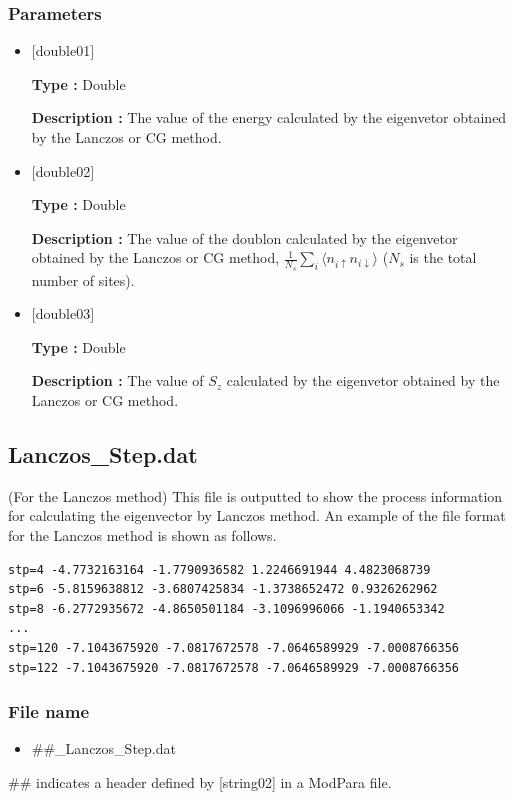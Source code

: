 \subsubsection{Parameters}
 \begin{itemize}

  \item  $[$double01$]$
  
 {\bf Type :} Double

{\bf Description :} The value of the energy calculated by the eigenvetor obtained by the Lanczos or CG method.
 
  \item  $[$double02$]$

 {\bf Type :} Double 

{\bf Description :}  The value of the doublon calculated by the eigenvetor obtained by the Lanczos or CG method,
$\frac{1}{N_s} \sum_{i}\langle n_{i\uparrow}n_{i\downarrow}\rangle$ ($N_s$ is the total number of sites).

  \item  $[$double03$]$

 {\bf Type :} Double 

{\bf Description :}  The value of $S_z$ calculated by the eigenvetor obtained by the Lanczos or CG method.

 \end{itemize}


\newpage
\subsection{Lanczos\_Step.dat}
(For the Lanczos method) 
This file is outputted to show the process information for calculating the eigenvector by Lanczos method.
An example of the file format for the Lanczos method is shown as follows.\\
\begin{minipage}{15cm}
\begin{screen}
\begin{verbatim}
stp=4 -4.7732163164 -1.7790936582 1.2246691944 4.4823068739
stp=6 -5.8159638812 -3.6807425834 -1.3738652472 0.9326262962
stp=8 -6.2772935672 -4.8650501184 -3.1096996066 -1.1940653342
...
stp=120 -7.1043675920 -7.0817672578 -7.0646589929 -7.0008766356
stp=122 -7.1043675920 -7.0817672578 -7.0646589929 -7.0008766356
\end{verbatim}
\end{screen}
\end{minipage}

\subsubsection{File name}
 \begin{itemize}
   \item  \#\#\_Lanczos\_Step.dat
  \end{itemize}
 \#\# indicates a header defined by [string02] in a ModPara file.

